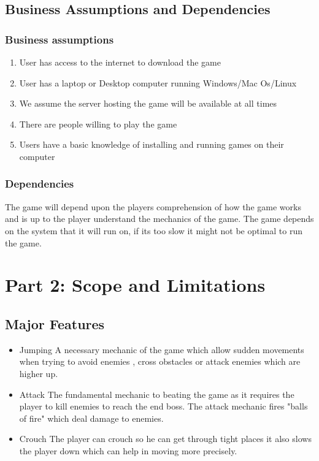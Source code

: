 \section{Business Assumptions and Dependencies}
\subsection{Business assumptions}
\begin{enumerate}
	\item User has access to the internet to download the game
	\item User has a laptop or Desktop computer running Windows/Mac Os/Linux
	\item We assume the server hosting the game will be available at all times
	\item There are people willing to play the game
	\item Users have a basic knowledge of installing and running games on their computer
\end{enumerate}

\subsection{Dependencies}
The game will depend upon the players comprehension of how the game works and is up to the player understand the mechanics of the game. The game depends on the system that it will run on, if its too slow it might not be optimal to run the game.

\chapter{Part 2: Scope and Limitations}


\section{Major Features}
\begin{itemize}
    \item Jumping
    A necessary mechanic of the game which allow sudden movements when trying to avoid enemies , cross obstacles or attack enemies which are higher up.
    \item Attack
    The fundamental mechanic to beating the game as it requires the player to kill enemies to reach the end boss. The attack mechanic fires "balls of fire" which deal damage to enemies.
    \item Crouch
    The player can crouch so he can get through tight places it also slows the player down which can help in moving more precisely.
\end{itemize}
